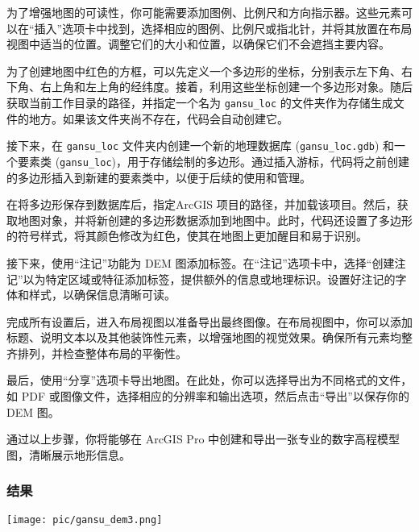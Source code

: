\documentclass{article}
\begin{document}
		为了增强地图的可读性，你可能需要添加图例、比例尺和方向指示器。这些元素可以在“插入”选项卡中找到，选择相应的图例、比例尺或指北针，并将其放置在布局视图中适当的位置。调整它们的大小和位置，以确保它们不会遮挡主要内容。
		
		为了创建地图中红色的方框，可以先定义一个多边形的坐标，分别表示左下角、右下角、右上角和左上角的经纬度。接着，利用这些坐标创建一个多边形对象。随后获取当前工作目录的路径，并指定一个名为 \texttt{gansu\_loc} 的文件夹作为存储生成文件的地方。如果该文件夹尚不存在，代码会自动创建它。
		
		接下来，在 \texttt{gansu\_loc} 文件夹内创建一个新的地理数据库 (\texttt{gansu\_loc.gdb}) 和一个要素类 (\texttt{gansu\_loc})，用于存储绘制的多边形。通过插入游标，代码将之前创建的多边形插入到新建的要素类中，以便于后续的使用和管理。

		在将多边形保存到数据库后，指定ArcGIS 项目的路径，并加载该项目。然后，获取地图对象，并将新创建的多边形数据添加到地图中。此时，代码还设置了多边形的符号样式，将其颜色修改为红色，使其在地图上更加醒目和易于识别。
		
		接下来，使用“注记”功能为 DEM 图添加标签。在“注记”选项卡中，选择“创建注记”以为特定区域或特征添加标签，提供额外的信息或地理标识。设置好注记的字体和样式，以确保信息清晰可读。
		
		完成所有设置后，进入布局视图以准备导出最终图像。在布局视图中，你可以添加标题、说明文本以及其他装饰性元素，以增强地图的视觉效果。确保所有元素均整齐排列，并检查整体布局的平衡性。
		
		最后，使用“分享”选项卡导出地图。在此处，你可以选择导出为不同格式的文件，如 PDF 或图像文件，选择相应的分辨率和输出选项，然后点击“导出”以保存你的 DEM 图。
		
		通过以上步骤，你将能够在 ArcGIS Pro 中创建和导出一张专业的数字高程模型图，清晰展示地形信息。
		
		
		
				\subsubsection{结果}


			\texttt{[image: pic/gansu\_dem3.png]} %
			
			\begin{comment}
						\texttt{[image: pic/xinjiang\_dem.png]} %
								
						\texttt{[image: pic/xizang\_dem.png]} %
						
						
														
						\texttt{[image: pic/sichuan\_dem.png]} %
						
						
												\texttt{[image: pic/neimeng\_dem.png]} %
												
												
																		
												\texttt{[image: pic/qinghai\_dem.png]} %
\end{comment}
\end{document}
